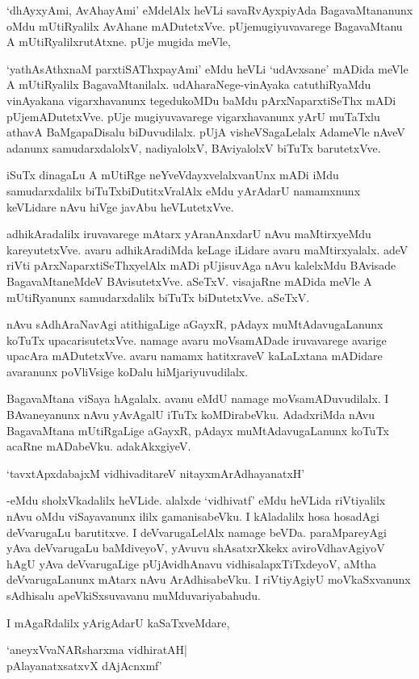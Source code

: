 `dhAyxyAmi, AvAhayAmi' eMdelAlx heVLi savaRvAyxpiyAda BagavaMtananunx oMdu mUtiRyalilx AvAhane mADutetxVve. pUjemugiyuvavarege BagavaMtanu A mUtiRyalilxrutAtxne. pUje mugida meVle,

`yathAsAthxnaM parxtiSAThxpayAmi' eMdu heVLi `udAvxsane' mADida meVle A mUtiRyalilx BagavaMtanilalx. udAharaNege-vinAyaka catuthiRyaMdu vinAyakana vigarxhavanunx tegedukoMDu baMdu pArxNaparxtiSeThx mADi pUjemADutetxVve. pUje mugiyuvavarege vigarxhavanunx yArU muTaTxlu athavA BaMgapaDisalu biDuvudilalx. pUjA visheVSagaLelalx AdameVle nAveV adanunx samudarxdalolxV, nadiyalolxV, BAviyalolxV biTuTx barutetxVve.

iSuTx dinagaLu A mUtiRge neYveVdayxvelalxvanUnx mADi iMdu samudarxdalilx biTuTxbiDutitxVralAlx eMdu yArAdarU namamxnunx keVLidare nAvu hiVge javAbu heVLutetxVve.

adhikAradalilx iruvavarege mAtarx yAranAnxdarU nAvu maMtirxyeMdu kareyutetxVve. avaru adhikAradiMda keLage iLidare avaru maMtirxyalalx. adeV riVti pArxNaparxtiSeThxyelAlx mADi pUjisuvAga nAvu kalelxMdu BAvisade BagavaMtaneMdeV BAvisutetxVve. aSeTxV. visajaRne mADida meVle A mUtiRyanunx samudarxdalilx biTuTx biDutetxVve. aSeTxV.

nAvu sAdhAraNavAgi atithigaLige aGayxR, pAdayx muMtAdavugaLanunx koTuTx upacarisutetxVve. namage avaru moVsamADade iruvavarege avarige upacAra mADutetxVve. avaru namamx hatitxraveV kaLaLxtana mADidare avaranunx poVliVsige koDalu hiMjariyuvudilalx.

BagavaMtana viSaya hAgalalx. avanu eMdU namage moVsamADuvudilalx. I BAvaneyanunx nAvu yAvAgalU iTuTx koMDirabeVku. AdadxriMda nAvu BagavaMtana mUtiRgaLige aGayxR, pAdayx muMtAdavugaLanunx koTuTx acaRne mADabeVku. adakAkxgiyeV.

\begin{shloka}
`tavxtApxdabajxM vidhivaditareV nitayxmArAdhayanatxH'
\end{shloka} 

-eMdu sholxVkadalilx heVLide. alalxde `vidhivatf' eMdu heVLida riVtiyalilx nAvu oMdu viSayavanunx ililx gamanisabeVku. I kAladalilx hosa hosadAgi deVvarugaLu barutitxve. I deVvarugaLelAlx namage beVDa. paraMpareyAgi yAva deVvarugaLu baMdiveyoV, yAvuvu shAsatxrXkekx aviroVdhavAgiyoV hAgU yAva deVvarugaLige pUjAvidhAnavu vidhisalapxTiTxdeyoV, aMtha deVvarugaLanunx mAtarx nAvu ArAdhisabeVku. I riVtiyAgiyU moVkaSxvanunx sAdhisalu apeVkiSxsuvavanu muMduvariyabahudu.

I mAgaRdalilx yArigAdarU kaSaTxveMdare,

\begin{shloka}
`aneyxVvaNARsharxma vidhiratAH|\\
pAlayanatxsatxvX dAjAcnxmf'
\end{shloka}

